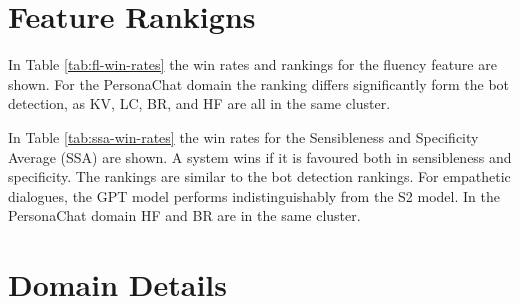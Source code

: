 \documentclass[11pt,a4paper]{article}
\begin{document}
\section{Feature Rankigns}


In Table \ref{tab:fl-win-rates} the win rates and rankings for the fluency feature are shown. For the PersonaChat domain the ranking differs significantly form the bot detection, as KV, LC, BR, and HF are all in the same cluster. 

In Table \ref{tab:ssa-win-rates} the win rates for the Sensibleness and
Specificity Average (SSA) are shown. A system wins if it is favoured both in sensibleness and specificity. The rankings are similar to the bot detection rankings. For empathetic dialogues, the GPT model performs indistinguishably from the S2 model. In the PersonaChat domain HF and BR are in the same cluster. 

\section{Domain Details}
\label{app:domain}

\begin{table}[h!]
\vspace{-1mm}
\begin{center}
\end{center}
\caption{Overview of the domains}
\label{table:domain-overview}
\end{table}
\end{document}
